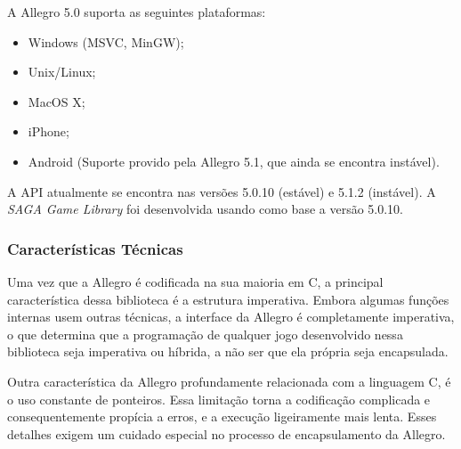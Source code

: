 \par
A Allegro 5.0 suporta as seguintes plataformas:
%
\begin{itemize}
 \item Windows (MSVC, MinGW);
 \item Unix/Linux;
 \item MacOS X;
 \item iPhone;
 \item Android (Suporte provido pela Allegro 5.1, que ainda se encontra instável).
\end{itemize}
%
A API atualmente se encontra nas versões 5.0.10 (estável) e 5.1.2 (instável). A \textit{SAGA Game Library} foi desenvolvida usando como base a versão 5.0.10.
%
\subsubsection{Características Técnicas}

Uma vez que a Allegro é codificada na sua maioria em C, a principal característica dessa biblioteca é a estrutura imperativa. Embora algumas funções internas usem outras técnicas, a interface da Allegro é completamente imperativa, o que determina que a programação de qualquer jogo desenvolvido nessa biblioteca seja imperativa ou híbrida, a não ser que ela própria seja encapsulada.
\par
Outra característica da Allegro profundamente relacionada com a linguagem C, é o uso constante de ponteiros. Essa limitação torna a codificação complicada e consequentemente propícia a erros, e a execução ligeiramente mais lenta. Esses detalhes exigem um cuidado especial no processo de encapsulamento da Allegro.
%
